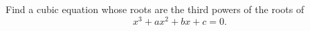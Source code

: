 Find a cubic equation whose roots are the third powers of the roots of
\[ x^3 + ax^2 + bx + c = 0. \]
